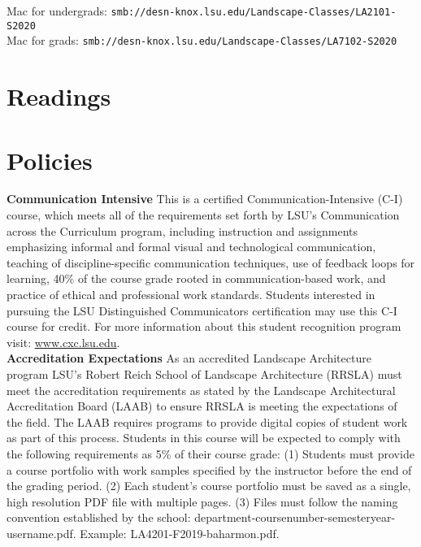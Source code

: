 \documentclass[11pt,article,oneside]{memoir}
\begin{document}
\noindent
Mac for undergrads: \verb|smb://desn-knox.lsu.edu/Landscape-Classes/LA2101-S2020| \\
Mac for grads: \verb|smb://desn-knox.lsu.edu/Landscape-Classes/LA7102-S2020| \\

\section{Readings}
\vspace*{0.5cm}
\nocite{*}
\setlength{}
\printbibliography[heading=none]

\clearpage

\section{Policies}


\noindent \textbf{Communication Intensive}
This is a certified Communication-Intensive (C-I) course,
which meets all of the requirements set
forth by LSU’s Communication across the Curriculum program, including
 instruction and assignments emphasizing
informal and formal visual and technological communication,
teaching of discipline-specific communication techniques,
use of feedback loops for learning,
40\% of the course grade rooted in communication-based work, and
practice of ethical and professional work standards.
Students interested in pursuing the LSU Distinguished Communicators 
certification may use this C-I course for credit. 
For more information about this student recognition program visit: 
\url{www.cxc.lsu.edu}.\\

\noindent \textbf{Accreditation Expectations}
As an accredited Landscape Architecture program
LSU's Robert Reich School of Landscape Architecture (RRSLA)
must meet the accreditation requirements
as stated by the Landscape Architectural Accreditation
Board (LAAB) to ensure RRSLA is meeting the expectations of the field.
The LAAB requires programs to provide digital copies
of student work as part of this process.
Students in this course will be expected
to comply with the following requirements
as 5\% of their course grade:
(1) Students must provide a course portfolio
with work samples specified by the instructor
before the end of the grading period.
(2) Each student's course portfolio must be saved as
a single, high resolution PDF file with multiple pages.
(3) Files must follow the naming convention
established by the school: department-coursenumber-semesteryear-username.pdf.
Example: LA4201-F2019-baharmon.pdf.\\
\end{document}
